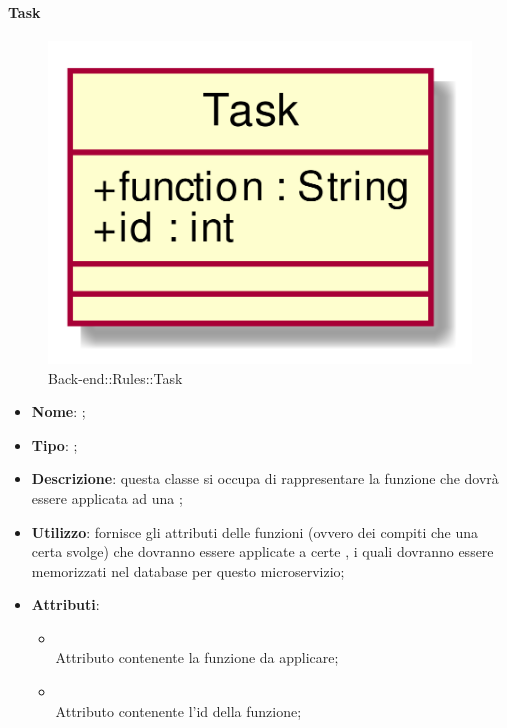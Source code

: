\hypertarget{Task_label}{\paragraph{Task}}
\begin{figure}[h]
	\centering
	\includegraphics[width=\textwidth,height=\textheight,keepaspectratio]{images/ClassTask.png}
	\caption{Back-end::Rules::Task}
\end{figure}
\begin{itemize}
	\item \textbf{Nome}: ;
	\item \textbf{Tipo}: ;
	\item \textbf{Descrizione}: questa classe si occupa di rappresentare la funzione che dovrà essere applicata ad una ;
	\item \textbf{Utilizzo}: fornisce gli attributi delle funzioni (ovvero dei compiti che una certa  svolge) che dovranno essere applicate a certe , i quali dovranno essere memorizzati nel database per questo microservizio;
	\item \textbf{Attributi}:
	\begin{itemize}
		\item[]  \\
		Attributo contenente la funzione da applicare;
		\item[]  \\
		Attributo contenente l'id della funzione;
	\end{itemize}
\end{itemize}

